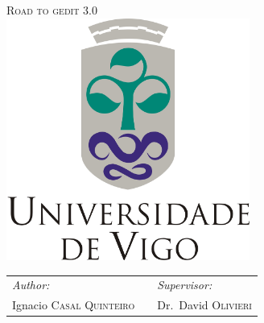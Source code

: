 
\begin{titlepage}

\begin{center}


\textsc{\Huge Road to gedit 3.0}\\[2.0cm]

\includegraphics[width=0.60\textwidth]{./images/uvigo}\\[2cm]

\vfill

\begin{tabularx}{\linewidth}{lXl}
\emph{Author:} && \emph{Supervisor:} \\
Ignacio \textsc{Casal Quinteiro} && Dr.~David \textsc{Olivieri}
\end{tabularx}

\end{center}

\end{titlepage}
